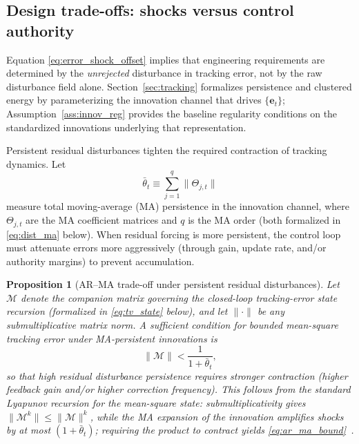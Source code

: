 \documentclass{article}
\newtheorem{proposition}{Proposition}
\begin{document}
\subsection{Design trade-offs: shocks versus control authority}
\label{sec:tradeoffs}

Equation \eqref{eq:error_shock_offset} implies that engineering requirements are determined by the
\emph{unrejected} disturbance in tracking error, not by the raw disturbance field alone.
Section~\ref{sec:tracking} formalizes persistence and clustered energy by parameterizing the innovation channel
that drives $\{\mathbf{e}_t\}$; Assumption~\ref{ass:innov_reg} provides the baseline regularity conditions on
the standardized innovations underlying that representation.

Persistent residual disturbances tighten the required contraction of tracking dynamics. Let
\begin{equation}
\bar{\theta}_t \equiv \sum_{j=1}^q \|\Theta_{j,t}\|
\end{equation}
measure total moving-average (MA) persistence in the innovation channel, where $\Theta_{j,t}$ are the MA coefficient matrices and $q$ is the MA order (both formalized in \eqref{eq:dist_ma} below).
When residual forcing is more persistent, the control loop must attenuate errors more aggressively (through gain,
update rate, and/or authority margins) to prevent accumulation.

\begin{proposition}[AR--MA trade-off under persistent residual disturbances]
\label{prop:ar_ma_tradeoff}
Let $\mathcal{M}$ denote the companion matrix governing the closed-loop tracking-error state recursion (formalized in \eqref{eq:tv_state} below), and let $\|\cdot\|$ be any submultiplicative matrix norm. A sufficient condition for bounded mean-square tracking error under MA-persistent innovations is
\begin{equation}
\|\mathcal{M}\| < \frac{1}{1+\bar{\theta}_t},
\label{eq:ar_ma_bound}
\end{equation}
so that high residual disturbance persistence requires stronger contraction (higher feedback gain and/or higher correction frequency). This follows from the standard Lyapunov recursion for the mean-square state: submultiplicativity gives $\|\mathcal{M}^k\|\le\|\mathcal{M}\|^k$, while the MA expansion of the innovation amplifies shocks by at most $(1+\bar{\theta}_t)$; requiring the product to contract yields \eqref{eq:ar_ma_bound}~\cite{hamilton1994,lutkepohl2005}.
\end{proposition}
\end{document}
